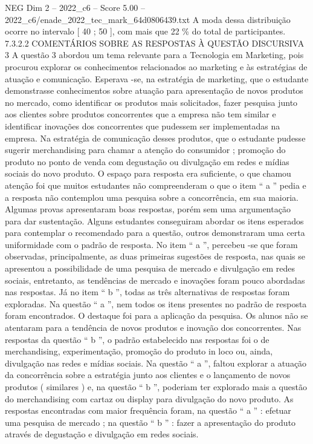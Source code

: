 \begin{textsample}{NEG Dim 2 – 2022\_c6 – Score 5.00 – 2022\_c6/enade\_2022\_tec\_mark\_64d0806439.txt}
A moda dessa distribuição ocorre no intervalo [ 40 ; 50 ], com mais que 22 \% do total de participantes. 7.3.2.2 COMENTÁRIOS SOBRE AS RESPOSTAS À QUESTÃO DISCURSIVA 3 A questão 3 abordou um tema relevante para a Tecnologia em Marketing, pois procurou explorar os conhecimentos relacionados ao marketing e às estratégias de atuação e comunicação.
Esperava -se, na estratégia de marketing, que o estudante demonstrasse conhecimentos sobre atuação para apresentação de novos produtos no mercado, como identificar os produtos mais solicitados, fazer pesquisa junto aos clientes sobre produtos concorrentes que a empresa não tem similar e identificar inovações dos concorrentes que pudessem ser implementadas na empresa.
Na estratégia de comunicação desses produtos, que o estudante pudesse sugerir merchandising para chamar a atenção do consumidor ; promoção do produto no ponto de venda com degustação ou divulgação em redes e mídias sociais do novo produto.
O espaço para resposta era suficiente, o que chamou atenção foi que muitos estudantes não compreenderam o que o item “ a ” pedia e a resposta não contemplou uma pesquisa sobre a concorrência, em sua maioria.
Algumas provas apresentaram boas respostas, porém sem uma argumentação para dar sustentação.
Alguns estudantes conseguiram abordar os itens esperados para contemplar o recomendado para a questão, outros demonstraram uma certa uniformidade com o padrão de resposta.
No item “ a ”, percebeu -se que foram observadas, principalmente, as duas primeiras sugestões de resposta, nas quais se apresentou a possibilidade de uma pesquisa de mercado e divulgação em redes sociais, entretanto, as tendências de mercado e inovações foram pouco abordadas nas respostas.
Já no item “ b ”, todas as três alternativas de respostas foram exploradas.
Na questão “ a ”, nem todos os itens presentes no padrão de resposta foram encontrados.
O destaque foi para a aplicação da pesquisa.
Os alunos não se atentaram para a tendência de novos produtos e inovação dos concorrentes.
Nas respostas da questão “ b ”, o padrão estabelecido nas respostas foi o de merchandising, experimentação, promoção do produto in loco ou, ainda, divulgação nas redes e mídias sociais.
Na questão “ a ”, faltou explorar a atuação da concorrência sobre a estratégia junto aos clientes e o lançamento de novos produtos ( similares ) e, na questão “ b ”, poderiam ter explorado mais a questão do merchandising com cartaz ou display para divulgação do novo produto.
As respostas encontradas com maior frequência foram, na questão “ a ” : efetuar uma pesquisa de mercado ; na questão “ b ” : fazer a apresentação do produto através de degustação e divulgação em redes sociais.

\end{textsample}
